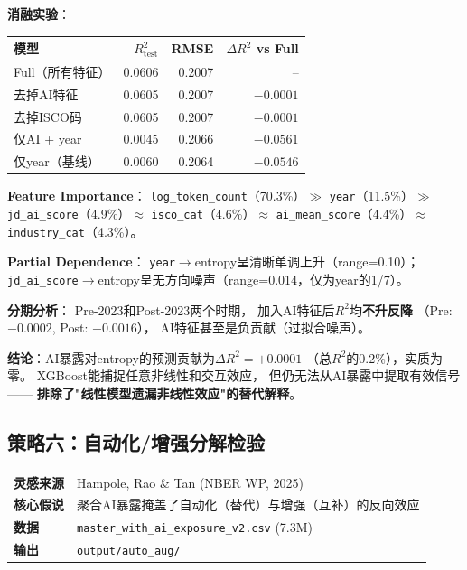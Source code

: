 \documentclass[12pt,a4paper]{ctexart}
\begin{document}
\begin{resultbox}[策略五：结果]
\textbf{消融实验}：

\begin{center}
\small
\begin{tabular}{lrrr}
\toprule
模型 & $R^2_\text{test}$ & RMSE & $\Delta R^2$ vs Full \\
\midrule
Full（所有特征） & 0.0606 & 0.2007 & -- \\
去掉AI特征 & 0.0605 & 0.2007 & $-0.0001$ \\
去掉ISCO码 & 0.0605 & 0.2007 & $-0.0001$ \\
仅AI + year & 0.0045 & 0.2066 & $-0.0561$ \\
仅year（基线） & 0.0060 & 0.2064 & $-0.0546$ \\
\bottomrule
\end{tabular}
\end{center}

\textbf{Feature Importance}：
\texttt{log\_token\_count}（70.3\%）$\gg$
\texttt{year}（11.5\%）$\gg$
\texttt{jd\_ai\_score}（4.9\%）$\approx$
\texttt{isco\_cat}（4.6\%）$\approx$
\texttt{ai\_mean\_score}（4.4\%）$\approx$
\texttt{industry\_cat}（4.3\%）。

\textbf{Partial Dependence}：
\texttt{year}$\to$entropy呈清晰单调上升（range=0.10）；
\texttt{jd\_ai\_score}$\to$entropy呈无方向噪声（range=0.014，仅为year的1/7）。

\textbf{分期分析}：
Pre-2023和Post-2023两个时期，
加入AI特征后$R^2$均\textbf{不升反降}
（Pre: $-0.0002$, Post: $-0.0016$），
AI特征甚至是负贡献（过拟合噪声）。

\textbf{结论}：AI暴露对entropy的预测贡献为$\Delta R^2 = +0.0001$
（总$R^2$的0.2\%），实质为零。
XGBoost能捕捉任意非线性和交互效应，
但仍无法从AI暴露中提取有效信号——
\textbf{排除了"线性模型遗漏非线性效应"的替代解释}。
\end{resultbox}


\subsection{策略六：自动化/增强分解检验}
\label{subsec:auto_aug}

\begin{center}
\begin{tabular}{ll}
\textbf{灵感来源} & Hampole, Rao \& Tan (NBER WP, 2025) \\
\textbf{核心假说} & 聚合AI暴露掩盖了自动化（替代）与增强（互补）的反向效应 \\
\textbf{数据} & \texttt{master\_with\_ai\_exposure\_v2.csv} (7.3M) \\
\textbf{输出} & \texttt{output/auto\_aug/}
\end{tabular}
\end{center}
\end{document}
